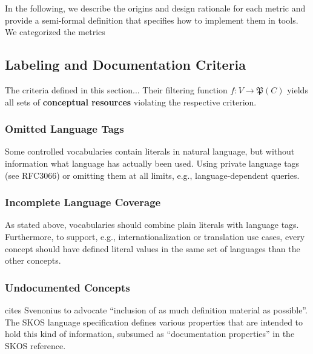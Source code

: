 
In the following, we describe the origins and design rationale for each metric and provide a semi-formal definition that specifies how to implement them in tools. We categorized the metrics 


\subsection{Labeling and Documentation Criteria}
The criteria defined in this section... Their filtering function \(f:V \rightarrow \mathfrak{P}(C)\) yields all sets of \textbf{conceptual resources} violating the respective criterion.

\subsubsection{Omitted Language Tags}
Some controlled vocabularies contain literals in natural language, but without information what language has actually been used. Using private language tags (see RFC3066) or omitting them at all limits, e.g., language-dependent queries.

\subsubsection{Incomplete Language Coverage}
As stated above, vocabularies should combine plain literals with language tags. Furthermore, to support, e.g., internationalization or translation use cases, every concept should have defined literal values in the same set of languages than the other concepts.

\subsubsection{Undocumented Concepts}
\cite{Aitchison2000} cites Svenonius to advocate ``inclusion of as much definition material as possible''. The SKOS language specification defines various properties that are intended to hold this kind of information, subsumed as ``documentation properties'' in the SKOS reference.

